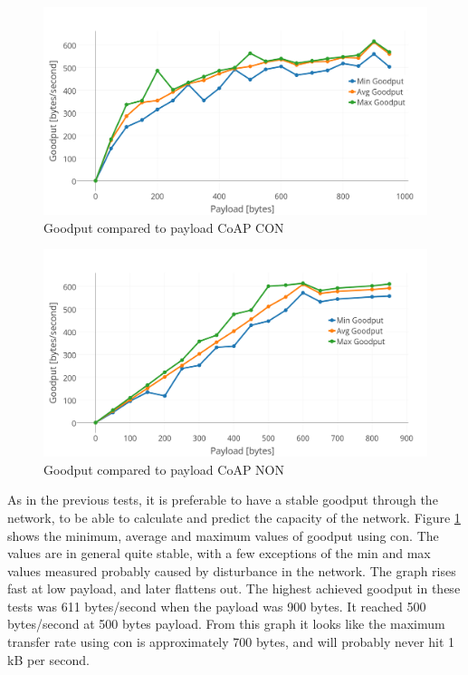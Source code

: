\begin{figure}[ht]
    \centering
    \includegraphics[width=1.0\textwidth]{goodput_payload_CON.png}    
    \caption{Goodput compared to payload CoAP CON}
    \label{fig:goodPayload_CON}
\end{figure}

\begin{figure}[h!]
    \centering
    \includegraphics[width=1.0\textwidth]{goodput_payload_NON.png}    
    \caption{Goodput compared to payload CoAP NON}
    \label{fig:goodPayload_NON}
\end{figure}


\noindent As in the previous tests, it is preferable to have a stable \gls{goodput} through the network, to be able to calculate and predict the capacity of the network. Figure \ref{fig:goodPayload_CON} shows the minimum, average and maximum values of \gls{goodput} using \gls{con}. The values are in general quite stable, with a few exceptions of the min and max values measured probably caused by disturbance in the network. The graph rises fast at low payload, and later flattens out. The highest achieved \gls{goodput} in these tests was 611 bytes/second when the \gls{payload} was 900 bytes. It reached 500 bytes/second at 500 bytes \gls{payload}. From this graph it looks like the maximum transfer rate using \gls{con} is approximately 700 bytes, and will probably never hit 1 kB per second. 


